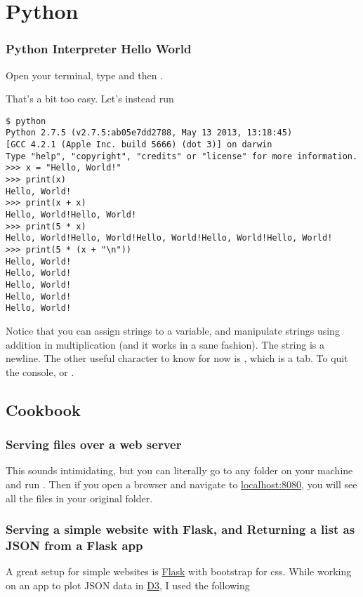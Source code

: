 \chapter{Python}

\subsection{Python Interpreter Hello World}
Open your terminal, type  and then .

That's a bit too easy. Let's instead run
\begin{lstlisting}[style=bash]
$ python
Python 2.7.5 (v2.7.5:ab05e7dd2788, May 13 2013, 13:18:45) 
[GCC 4.2.1 (Apple Inc. build 5666) (dot 3)] on darwin
Type "help", "copyright", "credits" or "license" for more information.
>>> x = "Hello, World!"
>>> print(x)
Hello, World!
>>> print(x + x)
Hello, World!Hello, World!
>>> print(5 * x)
Hello, World!Hello, World!Hello, World!Hello, World!Hello, World!
>>> print(5 * (x + "\n"))
Hello, World!
Hello, World!
Hello, World!
Hello, World!
Hello, World!
\end{lstlisting}

Notice that you can assign strings to a variable, and manipulate strings using 
addition in multiplication (and it works in a sane fashion).  The 
string is a newline.  The other useful character to know for now is 
, which is a tab.
To quit the console,  or .  

\section{Cookbook}

\subsection{Serving files over a web server}\label{subsec:pyhttpserver}
This sounds intimidating, but you can literally go to any folder on your
machine and run .  Then if you open
a browser and navigate to \href{localhost:8080}{localhost:8080}, you will see 
all the files in your original folder.

\subsection{Serving a simple website with Flask, and Returning a 
list as JSON from a Flask app}\label{subsec:flask}
A great setup for simple websites is 
\href{http://flask.pocoo.org/docs/}{Flask} with bootstrap for 
css.  While working on an app to plot JSON data in 
\href{http://d3js.org/}{D3}, I used the following 

